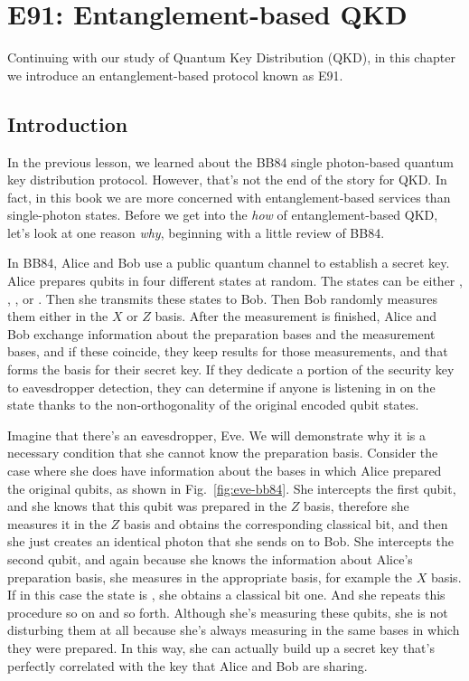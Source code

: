 \chapter{E91: Entanglement-based QKD}

Continuing with our study of Quantum Key Distribution (QKD), in this chapter we introduce an entanglement-based protocol known as E91.

\section{Introduction}


In the previous lesson, we learned about the BB84 single photon-based quantum key distribution protocol. However, that's not the end of the story for QKD.  In fact, in this book we are more concerned with entanglement-based services than single-photon states.  Before we get into the \emph{how} of entanglement-based QKD, let's look at one reason \emph{why}, beginning with a little review of BB84.

In BB84, Alice and Bob use a public quantum channel to establish a secret key.  Alice prepares qubits in four different states at random. The states can be either , , \ket{+}, or \ket{-}. Then she transmits these states to Bob. Then Bob randomly measures them either in the $X$ or $Z$ basis. After the measurement is finished, Alice and Bob exchange information about the preparation bases and the measurement bases, and if these coincide, they keep results for those measurements, and that forms the basis for their secret key. If they dedicate a portion of the security key to eavesdropper detection, they can determine if anyone is listening in on the state thanks to the non-orthogonality of the original encoded qubit states.

Imagine that there's an eavesdropper, Eve. We will demonstrate why it is a necessary condition that she cannot know the preparation basis. Consider the case where she does have information about the bases in which Alice prepared the original qubits, as shown in Fig.~\ref{fig:eve-bb84}. She intercepts the first qubit, and she knows that this qubit was prepared in the $Z$ basis, therefore she measures it in the $Z$ basis and obtains the corresponding classical bit, and then she just creates an identical photon that she sends on to Bob. She intercepts the second qubit, and again because she knows the information about Alice's preparation basis, she measures in the appropriate basis, for example the $X$ basis. If in this case the state is \ket{-}, she obtains a classical bit one. And she repeats this procedure so on and so forth.
Although she's measuring these qubits, she is not disturbing them at all because she's always measuring in the same bases in which they were prepared. In this way, she can actually build up a secret key that's perfectly correlated with the key that Alice and Bob are sharing.

